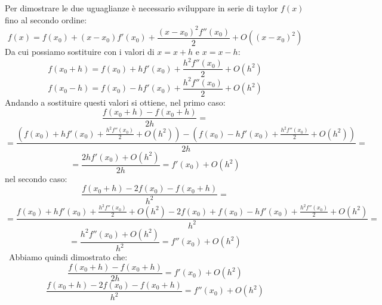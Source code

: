 Per dimostrare le due uguaglianze è necessario sviluppare in serie di taylor $f(x)$ fino al secondo ordine:
\[
f(x) = f(x_0) + (x-x_0)f'(x_0)+\frac{(x-x_0)^2f''(x_0)}{2} + O((x-x_0)^2)
\]
Da cui possiamo sostituire con i valori di $x=x+h$ e $x=x-h$:
\[
f(x_0+h)=f(x_0)+hf'(x_0)+\frac{h^2f''(x_0)}{2} + O(h^2)
\]
\[
f(x_0-h)=f(x_0)-hf'(x_0)+\frac{h^2f''(x_0)}{2} + O(h^2)
\]
Andando a sostituire questi valori si ottiene, nel primo caso:
\[
\frac{f(x_0 + h) - f(x_0 + h)}{2h} =
\]
\[
= \frac{(f(x_0)+hf'(x_0)+\frac{h^2f''(x_0)}{2} + O(h^2))-(f(x_0)-hf'(x_0)+\frac{h^2f''(x_0)}{2} + O(h^2))}{2h} = 
\]
\[
= \frac{2hf'(x_0)+O(h^2)}{2h} = f'(x_0)+O(h^2)
\]
nel secondo caso:
\[
\frac{f(x_0 + h) -2f(x_0) - f(x_0 + h)}{h^2} =
\]
\[
= \frac{f(x_0)+hf'(x_0)+\frac{h^2f''(x_0)}{2} + O(h^2) -2f(x_0) + f(x_0)-hf'(x_0)+\frac{h^2f''(x_0)}{2} + O(h^2)}{h^2} = 
\]
\[
= \frac{h^2f''(x_0)+O(h^2)}{h^2} = f''(x_0)+O(h^2)
\]
\
Abbiamo quindi dimostrato che:
\[
\frac{f(x_0 + h) - f(x_0 + h)}{2h} = f'(x_0)+O(h^2)
\]
\[
\frac{f(x_0 + h) -2f(x_0) - f(x_0 + h)}{h^2} = f''(x_0)+O(h^2)
\]